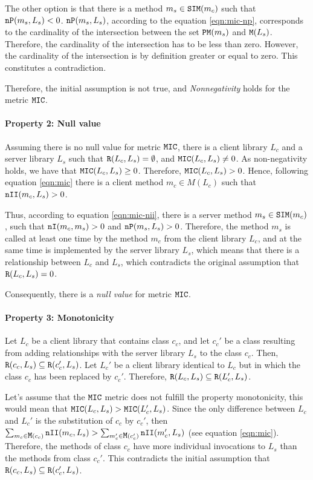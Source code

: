 The other option is that there is a method $m_s \in \verb|SIM|(m_c)$ such that $\verb|nP|(m_s, L_s) < 0$. $\verb|nP|(m_s, L_s)$, according to the equation \ref{eqn:mic-np}, corresponds to the cardinality of the intersection between the set $\verb|PM|(m_s)$ and $\verb|M|(L_s)$. Therefore, the cardinality of the intersection has to be less than zero. However, the cardinality of the intersection is by definition greater or equal to zero. This constitutes a contradiction.

Therefore, the initial assumption is not true, and \textit{Nonnegativity} holds for the metric $\verb|MIC|$.

\paragraph{Property 2: Null value}
Assuming there is no null value for metric $\verb|MIC|$, there is a client library $L_c$ and a server library $L_s$ such that $\verb|R|(L_c, L_s) = \emptyset$, and $\verb|MIC|(L_c, L_s)	\neq 0$. As non-negativity holds, we have that $\verb|MIC|(L_c, L_s) \ge 0$. Therefore, $\verb|MIC|(L_c, L_s) > 0$. Hence, following equation \ref{eqn:mic} there is a client method $m_c \in M(L_c)$ such that $\verb|nII|(m_c, L_s) > 0$.

Thus, according to equation \ref{eqn:mic-nii}, there is a server method $m_s \in \verb|SIM|(m_c)$, such that $\verb|nI|(m_c, m_s) > 0$ and $\verb|nP|(m_s, L_s) > 0$. Therefore, the method $m_s$ is called at least one time by the method $m_c$ from the client library $L_c$, and at the same time is implemented by the server library $L_s$, which means that there is a relationship between $L_c$ and $L_s$, which contradicts the original assumption that $\verb|R|(L_c, L_s) = 0$.

Consequently, there is a \textit{null value} for metric $\verb|MIC|$.

\paragraph{Property 3: Monotonicity}
Let $L_c$ be a client library that contains class $c_c$, and let $c_c'$ be a class resulting from adding relationships with the server library $L_s$ to the class $c_c$. Then, $\verb|R|(c_c, L_s) \subseteq \verb|R|(c_c', L_s)$. Let $L_c'$ be a client library identical to $L_c$ but in which the class $c_c$ has been replaced by $c_c'$. Therefore, $\verb|R|(L_c, L_s) \subseteq \verb|R|(L_c', L_s)$.

Let's assume that the $\verb|MIC|$ metric does not fulfill the property monotonicity, this would mean that $\verb|MIC|(L_c, L_s) > \verb|MIC|(L_c', L_s)$. Since the only difference between $L_c$ and $L_c'$ is the substitution of $c_c$ by $c_c'$, then $\sum_{m_c \in \verb|M|(c_c)} \verb|nII|(m_c, L_s) > \sum_{m_c' \in \verb|M|(c_c')} \verb|nII|(m_c', L_s)$ (see equation \ref{eqn:mic}). Therefore, the methods of class $c_c$ have more individual invocations to $L_s$ than the methods from class $c_c'$. This contradicts the initial assumption that $\verb|R|(c_c, L_s) \subseteq \verb|R|(c_c', L_s)$.

